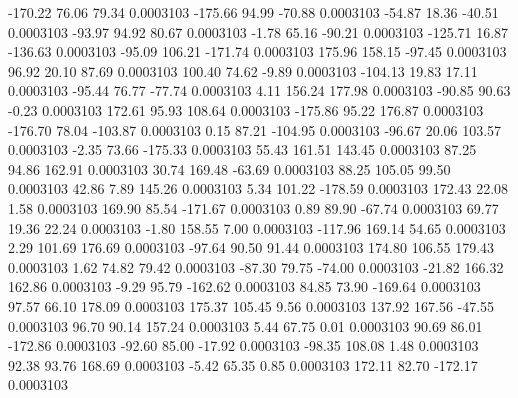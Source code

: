      -170.22       76.06       79.34     0.0003103
     -175.66       94.99      -70.88     0.0003103
      -54.87       18.36      -40.51     0.0003103
      -93.97       94.92       80.67     0.0003103
       -1.78       65.16      -90.21     0.0003103
     -125.71       16.87     -136.63     0.0003103
      -95.09      106.21     -171.74     0.0003103
      175.96      158.15      -97.45     0.0003103
       96.92       20.10       87.69     0.0003103
      100.40       74.62       -9.89     0.0003103
     -104.13       19.83       17.11     0.0003103
      -95.44       76.77      -77.74     0.0003103
        4.11      156.24      177.98     0.0003103
      -90.85       90.63       -0.23     0.0003103
      172.61       95.93      108.64     0.0003103
     -175.86       95.22      176.87     0.0003103
     -176.70       78.04     -103.87     0.0003103
        0.15       87.21     -104.95     0.0003103
      -96.67       20.06      103.57     0.0003103
       -2.35       73.66     -175.33     0.0003103
       55.43      161.51      143.45     0.0003103
       87.25       94.86      162.91     0.0003103
       30.74      169.48      -63.69     0.0003103
       88.25      105.05       99.50     0.0003103
       42.86        7.89      145.26     0.0003103
        5.34      101.22     -178.59     0.0003103
      172.43       22.08        1.58     0.0003103
      169.90       85.54     -171.67     0.0003103
        0.89       89.90      -67.74     0.0003103
       69.77       19.36       22.24     0.0003103
       -1.80      158.55        7.00     0.0003103
     -117.96      169.14       54.65     0.0003103
        2.29      101.69      176.69     0.0003103
      -97.64       90.50       91.44     0.0003103
      174.80      106.55      179.43     0.0003103
        1.62       74.82       79.42     0.0003103
      -87.30       79.75      -74.00     0.0003103
      -21.82      166.32      162.86     0.0003103
       -9.29       95.79     -162.62     0.0003103
       84.85       73.90     -169.64     0.0003103
       97.57       66.10      178.09     0.0003103
      175.37      105.45        9.56     0.0003103
      137.92      167.56      -47.55     0.0003103
       96.70       90.14      157.24     0.0003103
        5.44       67.75        0.01     0.0003103
       90.69       86.01     -172.86     0.0003103
      -92.60       85.00      -17.92     0.0003103
      -98.35      108.08        1.48     0.0003103
       92.38       93.76      168.69     0.0003103
       -5.42       65.35        0.85     0.0003103
      172.11       82.70     -172.17     0.0003103
